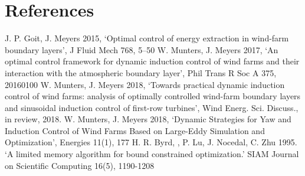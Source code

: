 \documentclass[a4paper]{jpconf}
\begin{document}
%		
%		
%		
%		
%		


\section*{References}
\begin{thebibliography}{9}
	 J. P. Goit, J. Meyers 2015, `Optimal control of energy extraction in wind-farm boundary layers', J Fluid Mech 768, 5--50
	 W. Munters, J. Meyers 2017, `An optimal control framework for dynamic induction control of wind farms and their interaction with the atmospheric boundary layer', Phil Trans R Soc A 375, 20160100
	 W. Munters, J. Meyers 2018, `Towards practical dynamic induction control of wind farms: analysis of optimally controlled wind-farm boundary layers and sinusoidal induction control of first-row turbines', Wind Energ. Sci. Discuss., in review, 2018. 
	 W. Munters, J. Meyers 2018, `Dynamic Strategies for Yaw and Induction Control of Wind Farms Based on Large-Eddy Simulation and Optimization', Energies 11(1), 177
	 H. R. Byrd, , P. Lu, J. Nocedal, C. Zhu 1995. `A limited memory algorithm for bound constrained optimization.' SIAM Journal on Scientific Computing 16(5), 1190-1208
\end{thebibliography}
\end{document}
